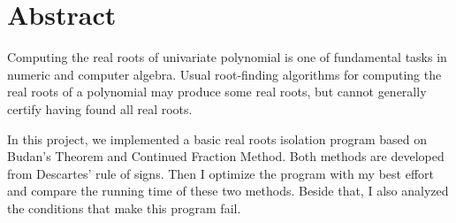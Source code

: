 \section{Abstract}

Computing the real roots of univariate polynomial is one of fundamental tasks in
numeric and computer algebra. Usual root-finding algorithms for computing the
real roots of a polynomial may produce some real roots, but cannot generally
certify having found all real roots.

In this project, we implemented a basic real roots isolation program based on
Budan's Theorem and Continued Fraction Method. Both methods are developed from 
Descartes' rule of signs. Then I optimize the program with my best effort and 
compare the running time of these two methods. Beside that, I also analyzed the
conditions that make this program fail.

